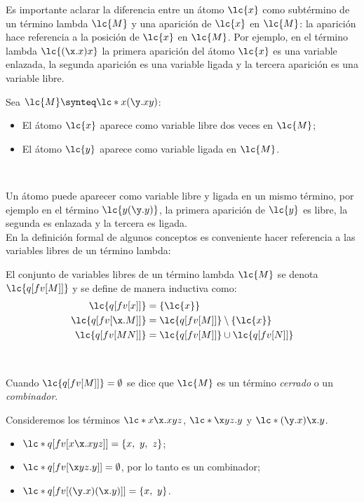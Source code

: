 Es importante aclarar la diferencia entre un átomo \(\lc{x}\) como subtérmino de
un término lambda \(\lc{M}\) y una aparición de \(\lc{x}\) en \(\lc{M}\): la
aparición hace referencia a la posición de \(\lc{x}\) en \(\lc{M}\). Por
ejemplo, en el término lambda \(\lc{(\x.x)x}\) la primera aparición del átomo
\(\lc{x}\) es una variable enlazada, la segunda aparición es una variable ligada
y la tercera aparición es una variable libre. \\

\begin{ejemplo} Sea \(\lc{M} \synteq \lc*{x(\y.x y)}\):  
  \begin{itemize}
  \item El átomo \(\lc{x}\) aparece como variable libre dos veces en
    \(\lc{M}\);
  \item El átomo \(\lc{y}\) aparece como variable ligada en \(\lc{M}\).
  \end{itemize}
\end{ejemplo} \

Un átomo puede aparecer como variable libre y ligada en un mismo término, por
ejemplo en el término \(\lc{y(\y.y)}\), la primera aparición de \(\lc{y}\) es
libre, la segunda es enlazada y la tercera es ligada. \\

En la definición formal de algunos conceptos es conveniente hacer referencia a
las variables libres de un término lambda: \\

\begin{defi} El conjunto de variables libres de un término lambda \(\lc{M}\) se denota
  \(\lc{q[fv[M]]}\) y se define de manera inductiva como:
  \label{definicion:variableslibres}
  \begin{align*}
    \lc{q[fv[x]]} &= \left\{ \lc{x} \right\} \\
    \lc{q[fv[\x.M]]} &= \lc{q[fv[M]]} \setminus \left\{ \lc{x} \right\} \\
    \lc{q[fv[M N]]} &= \lc{q[fv[M]]} \cup \lc{q[fv[N]]}
  \end{align*}
\end{defi} \

Cuando \(\lc{q[fv[M]]}=\emptyset\) se dice que \(\lc{M}\) es un término
\emph{cerrado} o un \emph{combinador}. \\

\begin{ejemplo} Consideremos los términos \(\lc*{x\x.x y z}\), \(\lc*{\x y
    z.y}\) y \(\lc*{(\y.x)\x.y}\).
  \begin{itemize}
  \item \(\lc*{q[fv[x \x.x y z]]} = \left\{ x,\ y,\ z \right\}\);
  \item \(\lc*{q[fv[\x y z.y]]} = \emptyset\), por lo tanto es un combinador;
  \item \(\lc*{q[fv[(\y.x)(\x.y)]]}=\left\{ x,\ y \right\}\).
  \end{itemize}
\end{ejemplo} \

